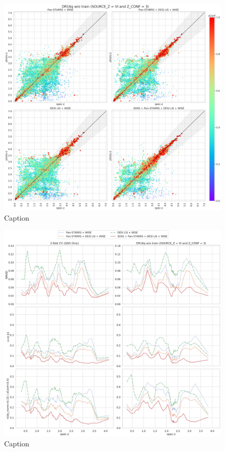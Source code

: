 \documentclass[fleqn,usenatbib]{mnras}
\begin{document}
\begin{figure}[ht]
    \centering
    \includegraphics[width=0.9\linewidth]{images/scatterplots-dr16q-wo-train.png}
    \caption{Caption}
    \label{fig:dr16q_wo_train}
\end{figure}

\begin{figure}[ht]
    \centering
    \includegraphics[width=0.9\linewidth]{images/metrics_spec-z.png}
    \caption{Caption}
    \label{fig:metrics_spec-z}
\end{figure}
\end{document}
